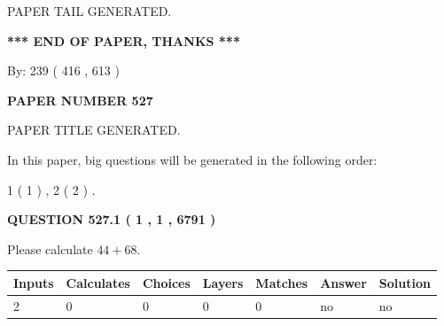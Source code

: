\documentclass[12pt]{article}
\begin{document}
   
   
\vspace{2.0in} PAPER TAIL GENERATED.
   
   
   
   
\vspace{1.0in} 
{\textbf{\large{ *** END OF PAPER, THANKS *** }}} 
   
   
\hspace{1.0in} By: 
 239 ( 416 ,  613 )
   
   
   
   
\newpage 
\setcounter{page}{ 
   527001 } 
   
   
   
   
 {\textbf{ \Large{ PAPER NUMBER  527  }}}
   
   
\vspace{0.2in}
   
   
   
   
   
   
   
   
 \vspace{0.2in}
 
 
 
 
   
   
 PAPER TITLE GENERATED.
   
   
   
\vspace{0.2in}
   
In this paper, big questions will be generated in the following order: 
   
   
   1 ( 1 )
 ,
   2 ( 2 )
 .
  
\vspace{0.2in}
  
{\textbf{\Large{QUESTION
527.1 
 ( 1 , 1 , 6791 )
}}}
  
  
 
Please calculate $ %
44 +  %
68 $.
 
 
   
   
   
   
\noindent\begin{tabular}{|l|l|l|l|l|l|l|}
 \hline
Inputs & Calculates & Choices & Layers & Matches & Answer & Solution \\ \hline
 2  & 
 0  & 
 0
  & 
 0  & 
 0  & 
  no & 
  no 
  \\ \hline
 \end{tabular}
   
\end{document}
